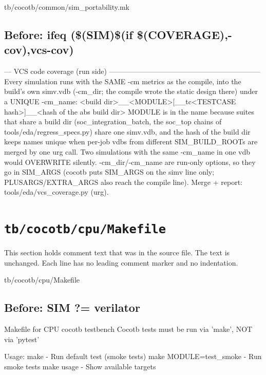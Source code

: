 \begin{relocated}{tb/cocotb/common/sim_portability.mk}
\subsection*{Before: ifeq (\$(SIM)\$(if \$(COVERAGE),-cov),vcs-cov)}

\begin{textblock}
--- VCS code coverage (run side) ---------------------------------------------------------------
Every simulation runs with the SAME -cm metrics as the compile, into the build's own simv.vdb
(-cm_dir; the compile wrote the static design there) under a UNIQUE -cm_name:
    <build dir>__<MODULE>[__tc<TESTCASE hash>]__<hash of the abs build dir>
MODULE is in the name because suites that share a build dir (soc_integration_batch, the soc_top
chains of tools/eda/regress_specs.py) share one simv.vdb, and the hash of the build dir keeps names
unique when per-job vdbs from different SIM_BUILD_ROOTs are merged by one urg call.  Two simulations
with the same -cm_name in one vdb would OVERWRITE silently.  -cm_dir/-cm_name are run-only options, so
they go in SIM_ARGS (cocotb puts SIM_ARGS on the simv line only; PLUSARGS/EXTRA_ARGS also reach the
compile line).  Merge + report: tools/eda/vcs_coverage.py (urg).
\end{textblock}

\end{relocated}

\section{\texttt{tb/cocotb/cpu/Makefile}}\label{tm:suite:cpu-makefile}

This section holds comment text that was in the source file. The text is unchanged. Each line has no leading comment marker and no indentation.

\begin{relocated}{tb/cocotb/cpu/Makefile}

\subsection*{Before: SIM ?= verilator}

\begin{textblock}
Makefile for CPU cocotb testbench
Cocotb tests must be run via 'make', NOT via 'pytest'

Usage:
  make                    - Run default test (smoke tests)
  make MODULE=test_smoke  - Run smoke tests
  make usage              - Show available targets
\end{textblock}

\end{relocated}

